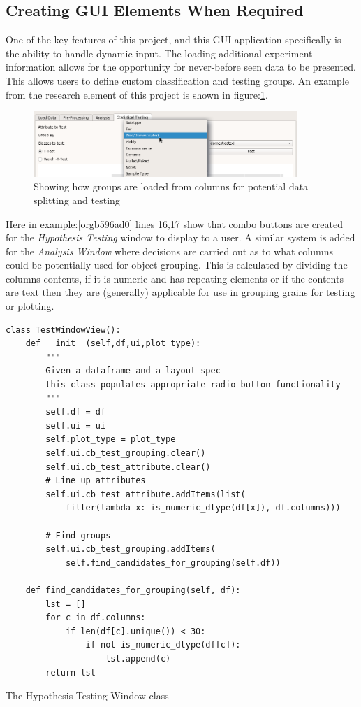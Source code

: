 \documentclass[11pt]{report}
\begin{document}
\subsection{Creating GUI Elements When Required}
\label{sec:org959e0ee}

One of the key features of this project, and this GUI application specifically is the ability to handle dynamic input. The loading additional experiment information allows for the opportunity for never-before seen data to be presented. This allows users to define custom classification and testing groups. An example from the research element of this project is shown in figure:\ref{fig:org1db8324}.

\begin{figure}[htbp]
\centering
\includegraphics[width=10cm]{./images/dynamicselection.png}
\caption{\label{fig:org1db8324}
Showing how groups are loaded from columns for potential data splitting and testing}
\end{figure}

Here in example:\ref{orgb596ad0} lines 16,17 show that combo buttons are created for the \emph{Hypothesis Testing} window to display to a user. A similar system is added for the \emph{Analysis Window} where decisions are carried out as to what columns could be potentially used for object grouping. This is calculated by dividing the columns contents, if it is numeric and has repeating elements or if the contents are text then they are (generally) applicable for use in grouping grains for testing or plotting.

\begin{listing}[htbp]
\begin{verbatim}
class TestWindowView():
    def __init__(self,df,ui,plot_type):
        """
        Given a dataframe and a layout spec
        this class populates appropriate radio button functionality
        """
        self.df = df
        self.ui = ui
        self.plot_type = plot_type
        self.ui.cb_test_grouping.clear()
        self.ui.cb_test_attribute.clear()
        # Line up attributes
        self.ui.cb_test_attribute.addItems(list(
            filter(lambda x: is_numeric_dtype(df[x]), df.columns)))

        # Find groups
        self.ui.cb_test_grouping.addItems(
            self.find_candidates_for_grouping(self.df))

    def find_candidates_for_grouping(self, df):
        lst = []
        for c in df.columns:
            if len(df[c].unique()) < 30:
                if not is_numeric_dtype(df[c]):
                    lst.append(c)
        return lst
\end{verbatim}
\caption{\label{orgb596ad0}
The Hypothesis Testing Window class}
\end{listing}
\end{document}
